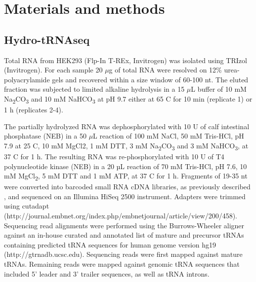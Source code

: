 \documentclass[12pt]{rockefeller}
\newcommand{\sub}[1]{\textsubscript{#1}}
\renewcommand{\deg}{\textdegree}
\begin{document}
\chapter{Materials and methods}

\section{Hydro-tRNAseq}
Total RNA from HEK293 (Flp-In T-REx, Invitrogen) was isolated using TRIzol (Invitrogen). For each sample 20 $\mu$g of total RNA were resolved on 12\% urea-polyacrylamide gels and recovered within a size window of 60-100 nt. The eluted fraction was subjected to limited alkaline hydrolysis in a 15 $\mu$L buffer of 10 mM Na\textsubscript{2}CO\textsubscript{3} and 10 mM NaHCO\textsubscript{3} at pH 9.7 either at 65 \deg C for 10 min (replicate 1) or 1 h (replicates 2-4).

The partially hydrolyzed RNA was dephosphorylated with 10 U of calf intestinal phosphatase (NEB) in a 50 $\mu$L reaction of 100 mM NaCl, 50 mM Tris-HCl, pH 7.9 at 25 \deg C, 10 mM MgCl2, 1 mM DTT, 3 mM Na\sub{2}CO\sub{3} and 3 mM NaHCO\sub{3}, at 37 \deg C for 1 h. The resulting RNA was re-phosphorylated with 10 U of T4 polynucleotide kinase (NEB) in a 20 µL reaction of 70 mM Tris-HCl, pH 7.6, 10 mM MgCl\sub{2}, 5 mM DTT and 1 mM ATP, at 37 \deg C for 1 h. Fragments of 19-35 nt were converted into barcoded small RNA cDNA libraries, as previously described \cite{Hafner:2012eaa}, and sequenced on an Illumina HiSeq 2500 instrument. Adapters were trimmed using cutadapt (http://journal.embnet.org/index.php/embnetjournal/article/view/200/458). Sequencing read alignments were performed using the Burrows-Wheeler aligner against an in-house curated and annotated list of mature and precursor tRNAs containing predicted tRNA sequences for human genome version hg19 (http://gtrnadb.ucsc.edu). Sequencing reads were first mapped against mature tRNAs. Remaining reads were mapped against genomic tRNA sequences that included 5’ leader and 3’ trailer sequences, as well as tRNA introns.
\end{document}
